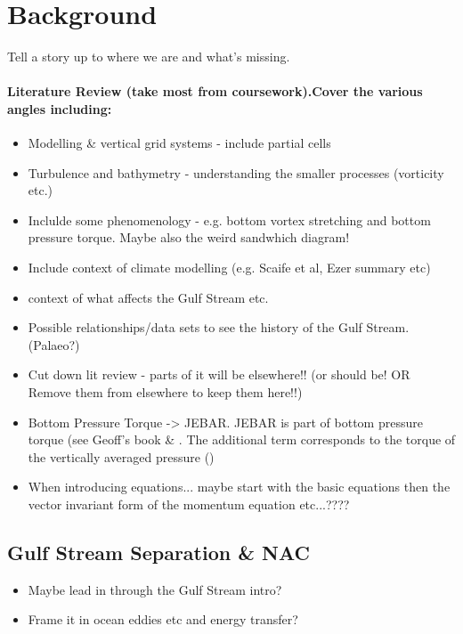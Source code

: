 \documentclass[..\EOYR.tex]{subfiles}
\begin{document}
\section{Background}
Tell a story up to where we are and what's missing.
\paragraph{Literature Review (take most from coursework).Cover the various angles including:}
\begin{itemize}
  \item Modelling \& vertical grid systems - include partial cells
  \item Turbulence and bathymetry - understanding the smaller processes (vorticity etc.) \citep{Tansley2001} \citep{Nikurashin2012a}
  \item Inclulde some phenomenology - e.g. bottom vortex stretching and bottom pressure torque. Maybe also the weird sandwhich diagram!
  \item Include context of climate modelling (e.g. Scaife et al, Ezer summary etc)
  \item context of what affects the Gulf Stream etc.
  \item Possible relationships/data sets to see the history of the Gulf Stream. (Palaeo?) \citep{Ezer2015}
  \item Cut down lit review - parts of it will be elsewhere!! (or should be! OR Remove them from elsewhere to keep them here!!)
    \item Bottom Pressure Torque -> JEBAR. JEBAR is part of bottom pressure torque (see Geoff's book \& \citep{Greatbatch1991}. The additional term corresponds to the torque of the vertically averaged pressure (\citep{Greatbatch1991})
    \item When introducing equations... maybe start with the basic equations then the vector invariant form of the momentum equation etc...????
\end{itemize}


\subsection{Gulf Stream Separation \& NAC}
\begin{itemize}
    \item Maybe lead in through the Gulf Stream intro?
    \item Frame it in ocean eddies etc and energy transfer?
\end{itemize}
\end{document}
